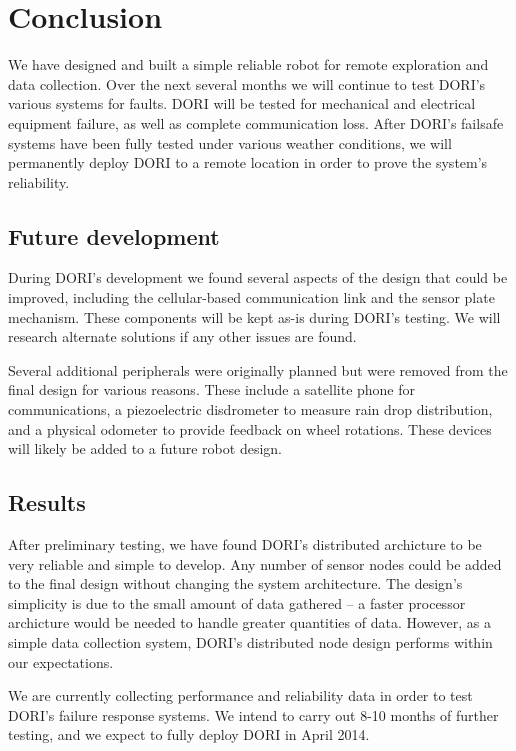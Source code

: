 \chapter{Conclusion}
    We have designed and built a simple reliable robot for remote exploration and data collection. Over the next several months we will continue to test DORI's various systems for faults. DORI will be tested for mechanical and electrical equipment failure, as well as complete communication loss. After DORI's failsafe systems have been fully tested under various weather conditions, we will permanently deploy DORI to a remote location in order to prove the system's reliability.

    
        \section{Future development}
    During DORI's development we found several aspects of the design that could be improved, including the cellular-based communication link and the sensor plate mechanism. These components will be kept as-is during DORI's testing. We will research alternate solutions if any other issues are found.
    
    Several additional peripherals were originally planned but were removed from the final design for various reasons. These include a satellite phone for communications, a piezoelectric disdrometer to measure rain drop distribution, and a physical odometer to provide feedback on wheel rotations. These devices will likely be added to a future robot design.
    
    \section{Results}
    After preliminary testing, we have found DORI's distributed archicture to be very reliable and simple to develop. Any number of sensor nodes could be added to the final design without changing the system architecture. The design's simplicity is due to the small amount of data gathered -- a faster processor archicture would be needed to handle greater quantities of data. However, as a simple data collection system, DORI's distributed node design performs within our expectations.

    We are currently collecting performance and reliability data in order to test DORI's failure response systems. We intend to carry out 8-10 months of further testing, and we expect to fully deploy DORI in April 2014.

